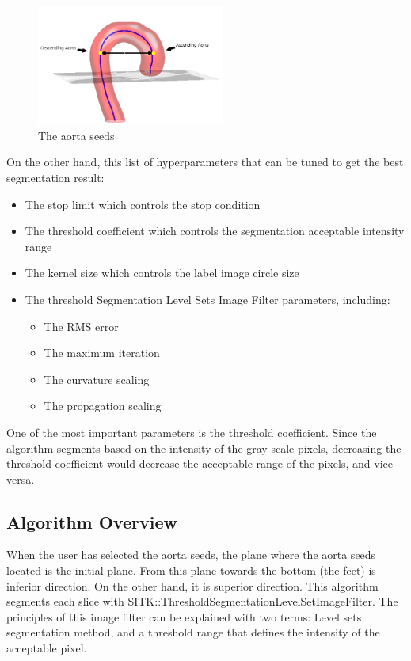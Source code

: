 \begin{figure}[ht]
    \centering
    \includegraphics[width=0.55\textwidth]{figures/Sample/Aorta_seeds.png}
    \caption[The Aorta Seeds]{The aorta seeds \citep{6346433}}
    \label{fig_aorta_seed}
\end{figure}

On the other hand, this list of hyperparameters that can be tuned to get the best segmentation result:
\begin{itemize}
\item The stop limit which controls the stop condition
\item The threshold coefficient which controls the segmentation acceptable intensity range
\item The kernel size which controls the label image circle size 
\item The threshold Segmentation Level Sets Image Filter parameters, including:
\begin{itemize}
\item The RMS error
\item The maximum iteration
\item The curvature scaling
\item The propagation scaling
\end{itemize}
\end{itemize}

One of the most important parameters is the threshold coefficient. Since the algorithm segments based on the intensity of the gray scale pixels, decreasing the threshold coefficient would decrease the acceptable range of the pixels, and vice-versa. 


\subsection{Algorithm Overview} \label{algo}

When the user has selected the aorta seeds, the plane where the aorta seeds located is the initial plane. From this plane towards the bottom (the feet) is inferior direction. On the other hand, it is superior direction. This algorithm segments each slice with SITK::ThresholdSegmentationLevelSetImageFilter. The principles of this image filter can be explained with two terms: Level sets segmentation method, and a threshold range that defines the intensity of the acceptable pixel.

